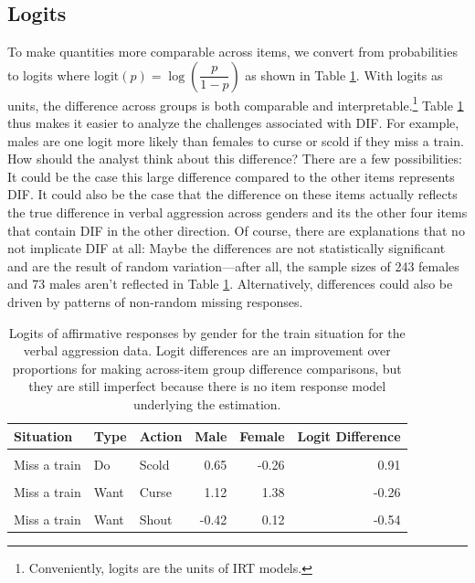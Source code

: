 \documentclass[
  english,
  man,floatsintext]{apa6}
\begin{document}
\hypertarget{logits}{%
\subsection{Logits}\label{logits}}

To make quantities more comparable across items, we convert from probabilities to logits where \(\text{logit}(p) = \log\left(\dfrac{p}{1 - p}\right)\) as shown in Table \ref{tab:logits}. With logits as units, the difference across groups is both comparable and interpretable.\footnote{Conveniently, logits are the units of IRT models.} Table \ref{tab:logits} thus makes it easier to analyze the challenges associated with DIF. For example, males are one logit more likely than females to curse or scold if they miss a train. How should the analyst think about this difference? There are a few possibilities: It could be the case this large difference compared to the other items represents DIF. It could also be the case that the difference on these items actually reflects the true difference in verbal aggression across genders and its the other four items that contain DIF in the other direction. Of course, there are explanations that no not implicate DIF at all: Maybe the differences are not statistically significant and are the result of random variation---after all, the sample sizes of 243 females and 73 males aren't reflected in Table \ref{tab:logits}. Alternatively, differences could also be driven by patterns of non-random missing responses.

\begin{table}[H]

\caption{\label{tab:logits}Logits of affirmative responses by gender for the train situation for the verbal aggression data. Logit differences are an improvement over proportions for making across-item group difference comparisons, but they are still imperfect because there is no item response model underlying the estimation. }
\centering
\fontsize{10}{12}\selectfont
\begin{tabular}[t]{lllrrr}
\toprule
Situation & Type & Action & Male & Female & Logit Difference\\
\midrule
\cellcolor{gray!6}{Miss a train} & \cellcolor{gray!6}{Do} & \cellcolor{gray!6}{Curse} & \cellcolor{gray!6}{1.44} & \cellcolor{gray!6}{0.44} & \cellcolor{gray!6}{1.00}\\
Miss a train & Do & Scold & 0.65 & -0.26 & 0.91\\
\cellcolor{gray!6}{Miss a train} & \cellcolor{gray!6}{Do} & \cellcolor{gray!6}{Shout} & \cellcolor{gray!6}{-0.91} & \cellcolor{gray!6}{-1.18} & \cellcolor{gray!6}{0.28}\\
Miss a train & Want & Curse & 1.12 & 1.38 & -0.26\\
\cellcolor{gray!6}{Miss a train} & \cellcolor{gray!6}{Want} & \cellcolor{gray!6}{Scold} & \cellcolor{gray!6}{0.42} & \cellcolor{gray!6}{0.55} & \cellcolor{gray!6}{-0.13}\\
\addlinespace
Miss a train & Want & Shout & -0.42 & 0.12 & -0.54\\
\bottomrule
\end{tabular}
\end{table}
\end{document}

